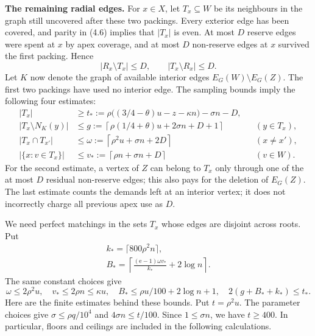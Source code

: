 \documentclass[english,11pt,a4paper]{article}
\begin{document}
\textbf{The remaining radial edges.} For \(x\in X\), let \(T_x\subseteq W\) be its neighbours in the graph still uncovered after these two packings. Every exterior edge has been covered, and parity in (4.6) implies that \(|T_x|\) is even. At most \(D\) reserve edges were spent at \(x\) by apex coverage, and at most \(D\) non-reserve edges at \(x\) survived the first packing. Hence \[|R_x\setminus T_x|\le D,\qquad |T_x\setminus R_x|\le D.\] Let \(K\) now denote the graph of available interior edges \(E_G(W)\setminus E_G(Z)\). The first two packings have used no interior edge. The sampling bounds imply the following four estimates: \[\begin{aligned}
|T_x|&\ge t_*:=\rho\bigl((3/4-\theta)u-z-\kappa n\bigr)-\sigma n-D,\\
|T_x\setminus N_K(y)|&\le
g:=\left\lceil\rho(1/4+\theta)u+2\sigma n+D+1\right\rceil
&& (y\in T_x),\\
|T_x\cap T_{x'}|&\le
\omega:=\left\lceil\rho^2u+\sigma n+2D\right\rceil
&& (x\ne x'),\\
|\{x:v\in T_x\}|&\le
v_*:=\left\lceil\rho n+\sigma n+D\right\rceil
&& (v\in W).
\end{aligned}\] For the second estimate, a vertex of \(Z\) can belong to \(T_x\) only through one of the at most \(D\) residual non-reserve edges; this also pays for the deletion of \(E_G(Z)\). The last estimate counts the demands left at an interior vertex; it does not incorrectly charge all previous apex use as \(D\).

We need perfect matchings in the sets \(T_x\) whose edges are disjoint across roots. Put \[\begin{gathered}
k_*=\lceil800\rho^2n\rceil,\\
B_*=\left\lceil\frac{(\mathrm e-1)\omega v_*}{k_*}+2\log n\right\rceil.
\end{gathered}\] The same constant choices give \[\omega\le2\rho^2u,\quad v_*\le2\rho n\le\kappa u,\quad
B_*\le\rho u/100+2\log n+1,\quad
2(g+B_*+k_*)\le t_*.\] Here are the finite estimates behind these bounds. Put \(t=\rho^2u\). The parameter choices give \(\sigma\le\rho q/10^4\) and \(4\sigma n\le t/100\). Since \(1\le\sigma n\), we have \(t\ge400\). In particular, floors and ceilings are included in the following calculations.
\end{document}
